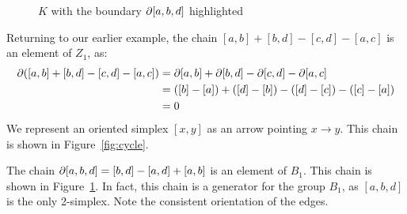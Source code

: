 \begin{figure}[h]
\centering
{}
\caption{$K$ with the boundary $\partial [a, b, d]$ highlighted}
\label{fig:boundary}
\end{figure}

\begin{example}
Returning to our earlier example, the chain $[a, b] + [b, d] - [c, d] - [a, c]$ is an element of $Z_1$, as:
\begin{align*}
  \partial([a, b] + [b, d] - [c, d] - [a, c]) &= \partial[a, b] + \partial[b, d] - \partial[c, d] - \partial[a, c] \\
  &= ([b] - [a]) + ([d] - [b]) - ([d] - [c]) - ([c] - [a]) \\
  &= 0
\end{align*}
We represent an oriented simplex $[x, y]$ as an arrow pointing $x \to y$. This chain is shown in Figure~\ref{fig:cycle}.

The chain $\partial [a,b,d] = [b, d] - [a, d] + [a, b]$ is an element of $B_1$. This chain is shown in Figure~\ref{fig:boundary}. In fact, this chain is a generator for the group $B_1$, as $[a,b,d]$ is the only 2-simplex. Note the consistent orientation of the edges.
\end{example}

